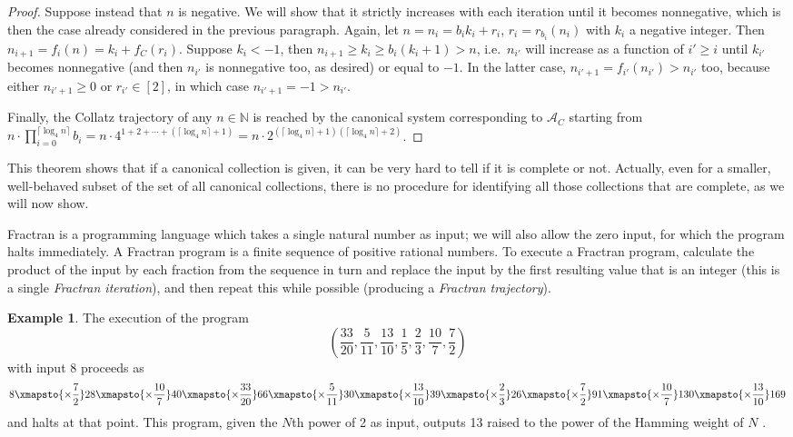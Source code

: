 \documentclass[12pt]{article}
\theoremstyle{definition}
\newtheorem{example}{Example}
\newcommand{\N}{\mathbb{N}}
\begin{document}
\begin{proof}
Suppose instead that $n$ is negative. We will show that it strictly increases with each iteration until it becomes nonnegative, which is then the case already considered in the previous paragraph. Again, let $n = n_i = b_ik_i+r_i$, $r_i = r_{b_i}(n_i)$ with $k_i$ a negative integer. Then $n_{i+1} = f_i(n) = k_i + f_C(r_i)$. Suppose $k_i<-1$, then $n_{i+1}\geqslant k_i \geqslant b_i(k_i+1) > n$, i.e.\ $n_{i'}$ will increase as a function of $i'\geqslant i$ until $k_{i'}$ becomes nonnegative (and then $n_{i'}$ is nonnegative too, as desired) or equal to $-1$. In the latter case, $n_{i'+1} = f_{i'}(n_{i'})>n_{i'}$ too, because either $n_{i'+1}\geqslant0$ or $r_{i'}\in[2]$, in which case $n_{i'+1}=-1>n_{i'}$.

Finally, the Collatz trajectory of any $n\in\N$ is reached by the canonical system corresponding to $\mathcal{A}_C$ starting from $n\cdot\prod_{i=0}^{\lceil\log_4n\rceil}b_i = n\cdot4^{1+2+\dotsb+(\lceil\log_4n\rceil+1)} = n\cdot2^{(\lceil\log_4n\rceil+1)(\lceil\log_4n\rceil+2)}$.
\end{proof}

This theorem shows that if a canonical collection is given, it can be very hard to tell if it is complete or not. Actually, even for a smaller, well-behaved subset of the set of all canonical collections, there is no procedure for identifying all those collections that are complete, as we will now show.

Fractran is a programming language which takes a single natural number as input; we will also allow the zero input, for which the program halts immediately. A Fractran program is a finite sequence of positive rational numbers. To execute a Fractran program, calculate the product of the input by each fraction from the sequence in turn and replace the input by the first resulting value that is an integer (this is a single \emph{Fractran iteration}), and then repeat this while possible (producing a \emph{Fractran trajectory}).

\begin{example}
The execution of the program
\[
\left( \frac{33}{20}, \frac{5}{11}, \frac{13}{10}, \frac{1}{5}, \frac{2}{3}, \frac{10}{7}, \frac{7}{2} \right)
\]
with input 8 proceeds as
\[
8 \xmapsto{\times\frac{7}{2}} 28 \xmapsto{\times\frac{10}{7}} 40 \xmapsto{\times\frac{33}{20}} 66 \xmapsto{\times\frac{5}{11}} 30 \xmapsto{\times\frac{13}{10}} 39 \xmapsto{\times\frac{2}{3}} 26 \xmapsto{\times\frac{7}{2}} 91 \xmapsto{\times\frac{10}{7}} 130 \xmapsto{\times\frac{13}{10}} 169
\]
and halts at that point. This program, given the $N$th power of 2 as input, outputs 13 raised to the power of the Hamming weight of $N$ \cite{stay}.
\end{example}
\end{document}
